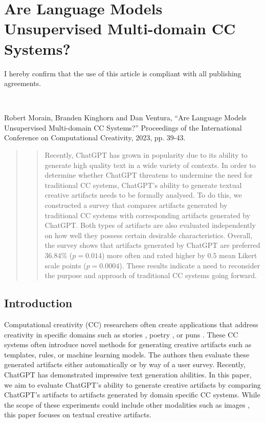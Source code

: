 \documentclass[phd,electronic,oneside,twosidetoc,letterpaper,chaptercenter,parttop,lof]{byumsphd}
\begin{document}
\chapter{Are Language Models Unsupervised Multi-domain CC Systems?} 
\label{chap:chatgpt_for_cc}

I hereby confirm that the use of this article is compliant with all publishing agreements.

\

\noindent
Robert Morain, Branden Kinghorn and Dan Ventura, ``Are Language Models Unsupervised Multi-domain CC Systems?'' Proceedings of the International Conference on Computational Creativity, 2023, pp. 39-43.
\begin{abstract}
\begin{quote}

Recently, ChatGPT has grown in popularity due to its ability to generate high quality text in a wide variety of contexts.  In order to determine whether ChatGPT threatens to undermine the need for traditional CC systems, ChatGPT's ability to generate textual creative artifacts needs to be formally analysed.
To do this, we constructed a survey that compares artifacts generated by traditional CC systems with corresponding artifacts generated by ChatGPT.
Both types of artifacts are also evaluated independently on how well they possess certain desirable characteristics.  Overall, the survey shows that artifacts generated by ChatGPT are preferred $36.84\%$ ($p=0.014$) more often and rated higher by $0.5$ mean Likert scale points ($p=0.0004$).
These results indicate a need to reconsider the purpose and approach of traditional CC systems going forward.

\end{quote}
\end{abstract}

\section{Introduction}

Computational creativity (CC) researchers often create applications that address creativity in specific domains such as stories \cite{perez2001mexica}, poetry \cite{boggia2022poetry}, or puns \cite{ritchie2003jape}.
These CC systems often introduce novel methods for generating creative artifacts such as templates, rules, or machine learning models.
The authors then evaluate these generated artifacts either automatically or by way of a user survey. 
Recently, ChatGPT \cite{chatGPT} has demonstrated impressive text generation abilities. 
In this paper, we aim to evaluate ChatGPT's ability to generate creative artifacts by comparing ChatGPT's artifacts to artifacts generated by domain specific CC systems.
While the scope of these experiments could include other modalities such as images \cite{ramesh2021dalle}, this paper focuses on textual creative artifacts.
\end{document}

